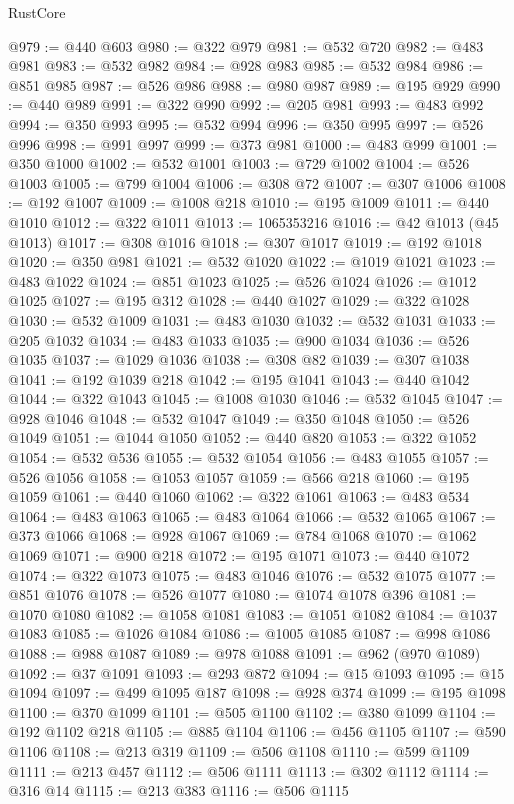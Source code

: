 \begin{lexlean}{RustCore}
\begin{coremodule}
@979 := @440 @603
@980 := @322 @979
@981 := @532 @720
@982 := @483 @981
@983 := @532 @982
@984 := @928 @983
@985 := @532 @984
@986 := @851 @985
@987 := @526 @986
@988 := @980 @987
@989 := @195 @929
@990 := @440 @989
@991 := @322 @990
@992 := @205 @981
@993 := @483 @992
@994 := @350 @993
@995 := @532 @994
@996 := @350 @995
@997 := @526 @996
@998 := @991 @997
@999 := @373 @981
@1000 := @483 @999
@1001 := @350 @1000
@1002 := @532 @1001
@1003 := @729 @1002
@1004 := @526 @1003
@1005 := @799 @1004
@1006 := @308 @72
@1007 := @307 @1006
@1008 := @192 @1007
@1009 := @1008 @218
@1010 := @195 @1009
@1011 := @440 @1010
@1012 := @322 @1011
@1013 := 1065353216
@1016 := @42 @1013 (@45 @1013)
@1017 := @308 @1016
@1018 := @307 @1017
@1019 := @192 @1018
@1020 := @350 @981
@1021 := @532 @1020
@1022 := @1019 @1021
@1023 := @483 @1022
@1024 := @851 @1023
@1025 := @526 @1024
@1026 := @1012 @1025
@1027 := @195 @312
@1028 := @440 @1027
@1029 := @322 @1028
@1030 := @532 @1009
@1031 := @483 @1030
@1032 := @532 @1031
@1033 := @205 @1032
@1034 := @483 @1033
@1035 := @900 @1034
@1036 := @526 @1035
@1037 := @1029 @1036
@1038 := @308 @82
@1039 := @307 @1038
@1041 := @192 @1039 @218
@1042 := @195 @1041
@1043 := @440 @1042
@1044 := @322 @1043
@1045 := @1008 @1030
@1046 := @532 @1045
@1047 := @928 @1046
@1048 := @532 @1047
@1049 := @350 @1048
@1050 := @526 @1049
@1051 := @1044 @1050
@1052 := @440 @820
@1053 := @322 @1052
@1054 := @532 @536
@1055 := @532 @1054
@1056 := @483 @1055
@1057 := @526 @1056
@1058 := @1053 @1057
@1059 := @566 @218
@1060 := @195 @1059
@1061 := @440 @1060
@1062 := @322 @1061
@1063 := @483 @534
@1064 := @483 @1063
@1065 := @483 @1064
@1066 := @532 @1065
@1067 := @373 @1066
@1068 := @928 @1067
@1069 := @784 @1068
@1070 := @1062 @1069
@1071 := @900 @218
@1072 := @195 @1071
@1073 := @440 @1072
@1074 := @322 @1073
@1075 := @483 @1046
@1076 := @532 @1075
@1077 := @851 @1076
@1078 := @526 @1077
@1080 := @1074 @1078 @396
@1081 := @1070 @1080
@1082 := @1058 @1081
@1083 := @1051 @1082
@1084 := @1037 @1083
@1085 := @1026 @1084
@1086 := @1005 @1085
@1087 := @998 @1086
@1088 := @988 @1087
@1089 := @978 @1088
@1091 := @962 (@970 @1089)
@1092 := @37 @1091
@1093 := @293 @872
@1094 := @15 @1093
@1095 := @15 @1094
@1097 := @499 @1095 @187
@1098 := @928 @374
@1099 := @195 @1098
@1100 := @370 @1099
@1101 := @505 @1100
@1102 := @380 @1099
@1104 := @192 @1102 @218
@1105 := @885 @1104
@1106 := @456 @1105
@1107 := @590 @1106
@1108 := @213 @319
@1109 := @506 @1108
@1110 := @599 @1109
@1111 := @213 @457
@1112 := @506 @1111
@1113 := @302 @1112
@1114 := @316 @14
@1115 := @213 @383
@1116 := @506 @1115

\end{coremodule}
\end{lexlean}
